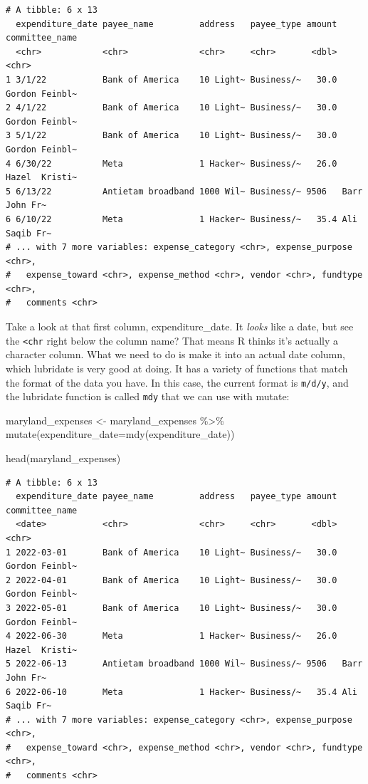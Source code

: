 \documentclass[
  letterpaper,
  DIV=11,
  numbers=noendperiod]{scrreprt}
\newenvironment{Shaded}{\begin{snugshade}}{\end{snugshade}}
\newcommand{\AttributeTok}[1]{\textcolor[rgb]{0.40,0.45,0.13}{#1}}
\newcommand{\FunctionTok}[1]{\textcolor[rgb]{0.28,0.35,0.67}{#1}}
\newcommand{\NormalTok}[1]{\textcolor[rgb]{0.00,0.23,0.31}{#1}}
\newcommand{\OtherTok}[1]{\textcolor[rgb]{0.00,0.23,0.31}{#1}}
\newcommand{\SpecialCharTok}[1]{\textcolor[rgb]{0.37,0.37,0.37}{#1}}
\begin{document}
\begin{verbatim}
# A tibble: 6 x 13
  expenditure_date payee_name         address   payee_type amount committee_name
  <chr>            <chr>              <chr>     <chr>       <dbl> <chr>         
1 3/1/22           Bank of America    10 Light~ Business/~   30.0 Gordon Feinbl~
2 4/1/22           Bank of America    10 Light~ Business/~   30.0 Gordon Feinbl~
3 5/1/22           Bank of America    10 Light~ Business/~   30.0 Gordon Feinbl~
4 6/30/22          Meta               1 Hacker~ Business/~   26.0 Hazel  Kristi~
5 6/13/22          Antietam broadband 1000 Wil~ Business/~ 9506   Barr  John Fr~
6 6/10/22          Meta               1 Hacker~ Business/~   35.4 Ali  Saqib Fr~
# ... with 7 more variables: expense_category <chr>, expense_purpose <chr>,
#   expense_toward <chr>, expense_method <chr>, vendor <chr>, fundtype <chr>,
#   comments <chr>
\end{verbatim}

Take a look at that first column, expenditure\_date. It \emph{looks}
like a date, but see the \texttt{\textless{}chr} right below the column
name? That means R thinks it's actually a character column. What we need
to do is make it into an actual date column, which lubridate is very
good at doing. It has a variety of functions that match the format of
the data you have. In this case, the current format is \texttt{m/d/y},
and the lubridate function is called \texttt{mdy} that we can use with
mutate:

\begin{Shaded}
\begin{Highlighting}[]
\NormalTok{maryland\_expenses }\OtherTok{\textless{}{-}}\NormalTok{ maryland\_expenses }\SpecialCharTok{\%\textgreater{}\%} \FunctionTok{mutate}\NormalTok{(}\AttributeTok{expenditure\_date=}\FunctionTok{mdy}\NormalTok{(expenditure\_date))}

\FunctionTok{head}\NormalTok{(maryland\_expenses)}
\end{Highlighting}
\end{Shaded}

\begin{verbatim}
# A tibble: 6 x 13
  expenditure_date payee_name         address   payee_type amount committee_name
  <date>           <chr>              <chr>     <chr>       <dbl> <chr>         
1 2022-03-01       Bank of America    10 Light~ Business/~   30.0 Gordon Feinbl~
2 2022-04-01       Bank of America    10 Light~ Business/~   30.0 Gordon Feinbl~
3 2022-05-01       Bank of America    10 Light~ Business/~   30.0 Gordon Feinbl~
4 2022-06-30       Meta               1 Hacker~ Business/~   26.0 Hazel  Kristi~
5 2022-06-13       Antietam broadband 1000 Wil~ Business/~ 9506   Barr  John Fr~
6 2022-06-10       Meta               1 Hacker~ Business/~   35.4 Ali  Saqib Fr~
# ... with 7 more variables: expense_category <chr>, expense_purpose <chr>,
#   expense_toward <chr>, expense_method <chr>, vendor <chr>, fundtype <chr>,
#   comments <chr>
\end{verbatim}
\end{document}
